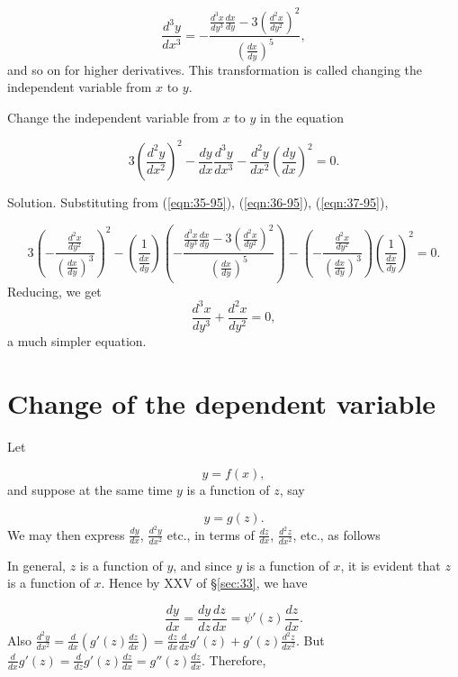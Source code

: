 \begin{equation}
\frac{d^3 y}{dx^3} 
= -\frac{ \frac{d^3 x}{dy^3} \frac{dx}{dy} 
- 3 \left( \frac{d^2 x}{dy^2} \right)^2 }{ \left( \frac{dx}{dy} \right)^5 }, 
\label{eqn:37-95}
\end{equation}
and so on for higher derivatives. This transformation is 
called changing the independent variable from $x$ to $y$.

\begin{example}
{\rm
Change the independent variable from $x$ to $y$ in the equation

\[
   3 \left( \frac{d^2 y}{dx^2} \right)^2 
- \frac{dy}{dx} \frac{d^3 y}{dx^3} 
- \frac{d^2 y}{dx^2} \left( \frac{dy}{dx} \right)^2 = 0.
\]

Solution. Substituting from (\ref{eqn:35-95}), 
(\ref{eqn:36-95}), (\ref{eqn:37-95}),

\[
   3 \left( -\frac{ \frac{d^2 x}{dy^2} }{ 
\left( \frac{dx}{dy} \right )^3 } \right)^2 
- \left( \frac{1}{ \frac{dx}{dy} } \right) 
\left( -\frac{ \frac{d^3 x}{dy^3} \frac{dx}{dy} 
- 3 \left( \frac{d^2 x}{dy^2} \right)^2 }{ 
\left( \frac{dx}{dy} \right)^5 } \right) 
- \left( -\frac{ \frac{d^2 x}{dy^2} }{ 
\left( \frac{dx}{dy} \right)^3 } \right) 
\left( \frac{1}{ \frac{dx}{dy} } \right)^2 = 0.
\]
Reducing, we get
\[
  \frac{d^3 x}{dy^3} + \frac{d^2 x}{dy^2} = 0,
\]
a much simpler equation.
}
\end{example}

\section{Change of the dependent variable}

Let

\[
y = f(x),
\]
and suppose at the same time $y$ is a function of $z$, say

\[
y = g(z).
\]
We may then express $\frac{dy}{dx}$, $\frac{d^2 y}{dx^2}$ etc., 
in terms of $\frac{dz}{dx}$, $\frac{d^2 z}{dx^2}$, etc., as follows

In general, $z$ is a function of $y$, %
and since $y$ is a function of $x$, %
it is evident that $z$ is a function of $x$. 
Hence by XXV of \S \ref{sec:33}, we have

\[
\frac{dy}{dx} 
= \frac{dy}{dz} \frac{dz}{dx} 
= \psi'(z) \frac{dz}{dx}.
\]
Also $\frac{d^2 y}{dx^2} 
= \frac{d}{dx} \left( g'(z) \frac{dz}{dx} \right) 
= \frac{dz}{dx} \frac{d}{dx} g'(z) 
+ g'(z) \frac{d^2 z}{dx^2}$. 
But 
$\frac{d}{dx} g'(z) = \frac{d}{dz} g'(z) \frac{dz}{dx} 
= g''(z) \frac{dz}{dx}$. Therefore,

